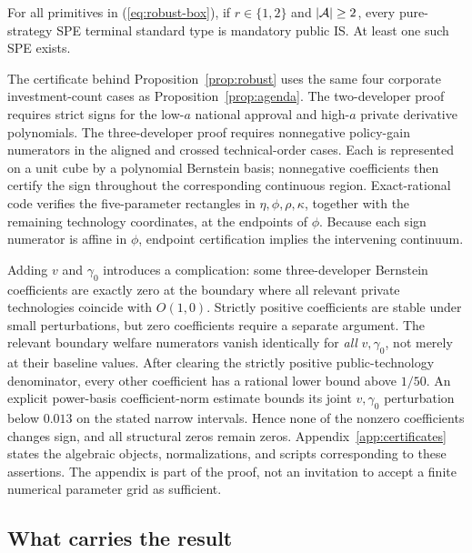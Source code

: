 \begin{proposition}
\label{prop:robust}
For all primitives in (\ref{eq:robust-box}), if \(r\in\{1,2\}\)
and \(|\mathcal{A}|\ge2\), every pure-strategy SPE terminal standard type
is mandatory public IS. At least one such SPE exists.
\end{proposition}

\noindent The certificate behind Proposition~\ref{prop:robust}
uses the same four corporate investment-count cases as
Proposition~\ref{prop:agenda}.
The two-developer proof requires strict signs for the
low-\(a\) national approval and high-\(a\) private derivative
polynomials. The three-developer proof requires nonnegative
policy-gain numerators in the aligned and crossed
technical-order cases. Each is represented on a unit cube
by a polynomial Bernstein basis; nonnegative coefficients
then certify the sign throughout the corresponding
continuous region. Exact-rational code verifies the
five-parameter rectangles in
\(\eta,\phi,\rho,\kappa\), together with the remaining
technology coordinates, at the endpoints of \(\phi\).
Because each sign numerator is affine in \(\phi\), endpoint
certification implies the intervening continuum.

Adding \(v\) and \(\gamma_0\) introduces a complication:
some three-developer Bernstein coefficients are exactly zero
at the boundary where all relevant private technologies
coincide with \(O(1,0)\).
Strictly positive coefficients are stable under small perturbations,
but zero coefficients require a separate argument.
The relevant boundary welfare numerators vanish identically
for \emph{all} \(v,\gamma_0\), not merely at their baseline values.
After clearing the strictly positive public-technology denominator,
every other coefficient has a rational lower bound above \(1/50\).
An explicit power-basis coefficient-norm estimate bounds
its joint \(v,\gamma_0\) perturbation below \(0.013\)
on the stated narrow intervals.
Hence none of the nonzero coefficients changes sign,
and all structural zeros remain zeros.
Appendix~\ref{app:certificates} states the algebraic objects,
normalizations, and scripts corresponding to these assertions.
The appendix is part of the proof, not an invitation to
accept a finite numerical parameter grid as sufficient.

\subsection{What carries the result}\label{subsec:mechanism}

